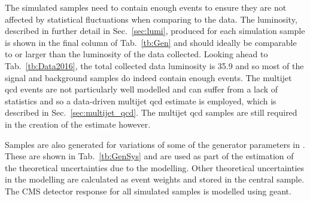 The simulated samples need to contain enough events to ensure they are not affected by statistical fluctuations when comparing to the data.
The luminosity, described in further detail in Sec.~\ref{sec:lumi}, produced for each simulation sample is shown in the final column of Tab.~\ref{tb:Gen} and should ideally be comparable to or larger than the luminosity of the data collected.
Looking ahead to Tab.~\ref{tb:Data2016}, the total collected data luminosity is 35.9\fbinv{} and so most of the signal and background samples do indeed contain enough events.
The multijet \acrshort{qcd} events are not particularly well modelled and can suffer from a lack of statistics and so a data-driven multijet \acrshort{qcd} estimate is employed, which is described in Sec.~\ref{sec:multijet_qcd}.
The multijet \acrshort{qcd} samples are still required in the creation of the estimate however.

Samples are also generated for variations of some of the generator parameters in \powhegpythia{}.
These are shown in Tab.~\ref{tb:GenSys} and are used as part of the estimation of the theoretical uncertainties due to the modelling.
Other theoretical uncertainties in the modelling are calculated as event weights and stored in the central \powhegpythia{} sample.
The CMS detector response for all simulated samples is modelled using \acrshort{geant}.








